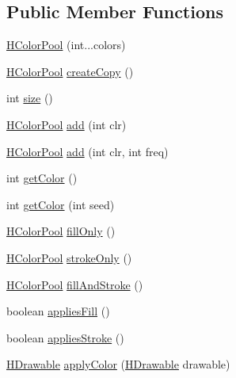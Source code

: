 \subsection*{Public Member Functions}
\begin{DoxyCompactItemize}
\item 
\hyperlink{classhype_1_1colorist_1_1_h_color_pool_ac4bfea1f848d1392ae4462677b5f6c53}{H\-Color\-Pool} (int...\-colors)
\item 
\hyperlink{classhype_1_1colorist_1_1_h_color_pool}{H\-Color\-Pool} \hyperlink{classhype_1_1colorist_1_1_h_color_pool_a3f7606f640ffec3d1d38d0f2cd10fc78}{create\-Copy} ()
\item 
int \hyperlink{classhype_1_1colorist_1_1_h_color_pool_a5a0cbde1d4e77aa556a7e1e128da0ce2}{size} ()
\item 
\hyperlink{classhype_1_1colorist_1_1_h_color_pool}{H\-Color\-Pool} \hyperlink{classhype_1_1colorist_1_1_h_color_pool_ab6128d3bef5bf624c38ed7a928f3da19}{add} (int clr)
\item 
\hyperlink{classhype_1_1colorist_1_1_h_color_pool}{H\-Color\-Pool} \hyperlink{classhype_1_1colorist_1_1_h_color_pool_a5aa0b377f3f0f4579a44d6ceaabfa083}{add} (int clr, int freq)
\item 
int \hyperlink{classhype_1_1colorist_1_1_h_color_pool_a85d10eedeb9e885c94c06adc832d34f5}{get\-Color} ()
\item 
int \hyperlink{classhype_1_1colorist_1_1_h_color_pool_ae89fd9600b726a9beec7e0eabb811828}{get\-Color} (int seed)
\item 
\hyperlink{classhype_1_1colorist_1_1_h_color_pool}{H\-Color\-Pool} \hyperlink{classhype_1_1colorist_1_1_h_color_pool_afb113623317e9f893b3f08348e2e6ced}{fill\-Only} ()
\item 
\hyperlink{classhype_1_1colorist_1_1_h_color_pool}{H\-Color\-Pool} \hyperlink{classhype_1_1colorist_1_1_h_color_pool_a642aa9b2b99cb0c71eebfe358c8b8b44}{stroke\-Only} ()
\item 
\hyperlink{classhype_1_1colorist_1_1_h_color_pool}{H\-Color\-Pool} \hyperlink{classhype_1_1colorist_1_1_h_color_pool_aad7efb3fc0ec69eafeef4356aeb84351}{fill\-And\-Stroke} ()
\item 
boolean \hyperlink{classhype_1_1colorist_1_1_h_color_pool_abd17ba965c794d176b3b1c463f362679}{applies\-Fill} ()
\item 
boolean \hyperlink{classhype_1_1colorist_1_1_h_color_pool_ae982edea259c2e0d6132b000116c1201}{applies\-Stroke} ()
\item 
\hyperlink{classhype_1_1drawable_1_1_h_drawable}{H\-Drawable} \hyperlink{classhype_1_1colorist_1_1_h_color_pool_aed067651aacc655889e86d2776f48a49}{apply\-Color} (\hyperlink{classhype_1_1drawable_1_1_h_drawable}{H\-Drawable} drawable)
\end{DoxyCompactItemize}
